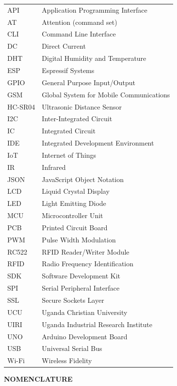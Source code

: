 \documentclass[12pt,a4paper]{report}
\begin{document}
\begin{tabular}{ll}
API & Application Programming Interface \\
AT & Attention (command set) \\
CLI & Command Line Interface \\
DC & Direct Current \\
DHT & Digital Humidity and Temperature \\
ESP & Espressif Systems \\
GPIO & General Purpose Input/Output \\
GSM & Global System for Mobile Communications \\
HC-SR04 & Ultrasonic Distance Sensor \\
I2C & Inter-Integrated Circuit \\
IC & Integrated Circuit \\
IDE & Integrated Development Environment \\
IoT & Internet of Things \\
IR & Infrared \\
JSON & JavaScript Object Notation \\
LCD & Liquid Crystal Display \\
LED & Light Emitting Diode \\
MCU & Microcontroller Unit \\
PCB & Printed Circuit Board \\
PWM & Pulse Width Modulation \\
RC522 & RFID Reader/Writer Module \\
RFID & Radio Frequency Identification \\
SDK & Software Development Kit \\
SPI & Serial Peripheral Interface \\
SSL & Secure Sockets Layer \\
UCU & Uganda Christian University \\
UIRI & Uganda Industrial Research Institute \\
UNO & Arduino Development Board \\
USB & Universal Serial Bus \\
Wi-Fi & Wireless Fidelity \\
\end{tabular}

\newpage

{\fontsize{14}{16.8}\selectfont\bfseries\centering NOMENCLATURE\par}
\vspace{10pt}
\end{document}
